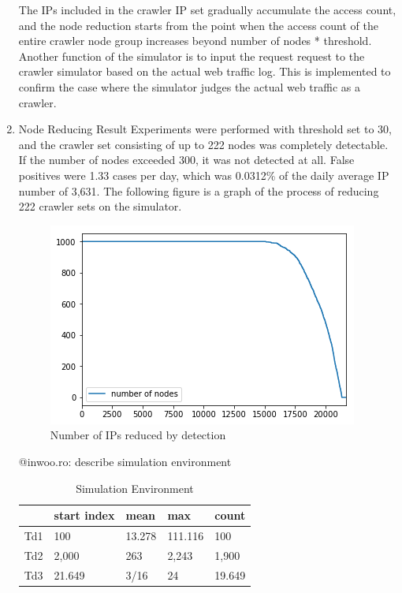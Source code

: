 \documentclass[sigconf,anonymous=false]{acmart}
\begin{document}
\begin{enumerate}
The IPs included in the crawler IP set gradually accumulate the access count, and the node reduction starts from the point when the access count of the entire crawler node group increases beyond {number of nodes} * {threshold}.
Another function of the simulator is to input the request request to the crawler simulator based on the actual web traffic log. This is implemented to confirm the case where the simulator judges the actual web traffic as a crawler.
\newline
\item Node Reducing Result
\newline 
Experiments were performed with threshold set to 30, and the crawler set consisting of up to 222 nodes was completely detectable. If the number of nodes exceeded 300, it was not detected at all. False positives were 1.33 cases per day, which was 0.0312\% of the daily average IP number of 3,631. The following figure is a graph of the process of reducing 222 crawler sets on the simulator. \\

\begin{figure}[H]
    \centering
    \includegraphics[width=0.7\columnwidth]{figs/figure_06_nr.png}
    \caption{Number of IPs reduced by detection}
    \label{fig:my_label}
\end{figure}

@inwoo.ro: describe simulation environment

\begin{table}[H]
  \caption{Simulation Environment}
    \begin{tabular}{| l | l | l | l | l | }
    \hline
    & start index & mean & max & count \\ \hline
    Td1 & 100 & 13.278 & 111.116 & 100 \\ 
    Td2 & 2,000 & 263 & 2,243 & 1,900 \\
    Td3 & 21.649 & 3/16 & 24 & 19.649 \\ \hline
    \end{tabular}
\end{table}


\end{enumerate}
\end{document}
